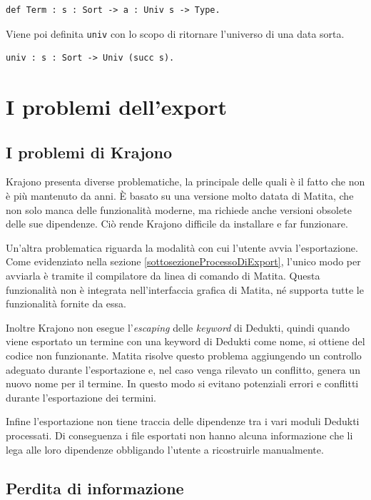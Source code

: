 \documentclass[12pt,a4paper]{mimosis}
\begin{document}
\begin{lstlisting}
def Term : s : Sort -> a : Univ s -> Type.
\end{lstlisting}

Viene poi definita \texttt{univ} con lo scopo di ritornare l'universo di una
data sorta.
\begin{lstlisting}
univ : s : Sort -> Univ (succ s).
\end{lstlisting}

\section{I problemi dell'export}

\subsection{I problemi di Krajono}
Krajono presenta diverse problematiche, la principale delle quali è il fatto che non
è più mantenuto da anni. È basato su una versione molto datata di Matita, che non
solo manca delle funzionalità moderne, ma richiede anche versioni obsolete delle 
sue dipendenze. Ciò rende Krajono difficile da installare e far funzionare.

Un'altra problematica riguarda la modalità con cui l'utente avvia l'esportazione.
Come evidenziato nella sezione \ref{sottosezioneProcessoDiExport}, l'unico modo
per avviarla è tramite il compilatore da linea di comando di Matita.
Questa funzionalità non è integrata nell'interfaccia grafica di Matita, né supporta
tutte le funzionalità fornite da essa.

Inoltre Krajono non esegue l'\textit{escaping} delle \textit{keyword} di Dedukti,
quindi quando viene esportato un termine con una keyword di Dedukti come nome, si
ottiene del codice non funzionante. Matita risolve questo problema aggiungendo un controllo adeguato durante
l'esportazione e, nel caso venga rilevato un conflitto, genera un nuovo nome per il 
termine. In questo modo si evitano potenziali errori e conflitti durante l'esportazione 
dei termini.

Infine l'esportazione non tiene traccia delle dipendenze tra i vari moduli Dedukti 
processati. Di conseguenza i file esportati non hanno alcuna informazione che li
lega alle loro dipendenze obbligando l'utente a ricostruirle manualmente.

\subsection{Perdita di informazione}
\end{document}
